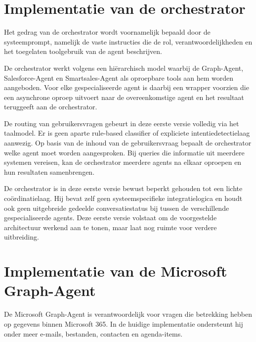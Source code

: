 

\section{Implementatie van de orchestrator}
\label{sec:impl-orchestrator}

Het gedrag van de orchestrator wordt voornamelijk bepaald door de systeemprompt, namelijk de vaste instructies die de rol, verantwoordelijkheden en het toegelaten toolgebruik van de agent beschrijven.

De orchestrator werkt volgens een hiërarchisch model waarbij de Graph-Agent, Salesforce-Agent en Smartsales-Agent als oproepbare tools aan hem worden aangeboden. Voor elke gespecialiseerde agent is daarbij een wrapper voorzien die een asynchrone oproep uitvoert naar de overeenkomstige agent en het resultaat teruggeeft aan de orchestrator.

De routing van gebruikersvragen gebeurt in deze eerste versie volledig via het taalmodel. Er is geen aparte rule-based classifier of expliciete intentiedetectielaag aanwezig. Op basis van de inhoud van de gebruikersvraag bepaalt de orchestrator welke agent moet worden aangesproken. Bij queries die informatie uit meerdere systemen vereisen, kan de orchestrator meerdere agents na elkaar oproepen en hun resultaten samenbrengen.

De orchestrator is in deze eerste versie bewust beperkt gehouden tot een lichte coördinatielaag. Hij bevat zelf geen systeemspecifieke integratielogica en houdt ook geen uitgebreide gedeelde conversatiestatus bij tussen de verschillende gespecialiseerde agents. Deze eerste versie volstaat om de voorgestelde architectuur werkend aan te tonen, maar laat nog ruimte voor verdere uitbreiding.

\section{Implementatie van de Microsoft Graph-Agent}
\label{sec:impl-graph}

De Microsoft Graph-Agent is verantwoordelijk voor vragen die betrekking hebben op gegevens binnen Microsoft 365. In de huidige implementatie ondersteunt hij onder meer e-mails, bestanden, contacten en agenda-items.

